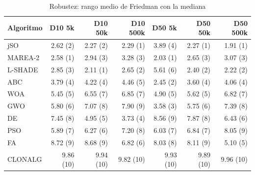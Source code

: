 \begin{table}[ht]\centering\small
\caption{Robustez: rango medio de Friedman con la mediana}
\begin{tabular}{lrrrrrr}
\toprule
Algoritmo & D10 5k & D10 50k & D10 500k & D50 5k & D50 50k & D50 500k \\
\midrule
jSO & 2.62 (2) & 2.27 (2) & 2.29 (1) & 3.89 (4) & 2.27 (1) & 1.91 (1) \\
MAREA-2 & 2.58 (1) & 2.94 (3) & 3.28 (3) & 2.03 (1) & 2.65 (3) & 3.07 (3) \\
L-SHADE & 2.85 (3) & 2.11 (1) & 2.65 (2) & 5.61 (6) & 2.40 (2) & 2.22 (2) \\
ABC & 3.79 (4) & 4.22 (4) & 4.46 (5) & 2.45 (2) & 3.60 (4) & 4.06 (4) \\
WOA & 5.45 (5) & 6.55 (7) & 6.85 (7) & 4.90 (5) & 5.62 (5) & 6.82 (7) \\
GWO & 5.80 (6) & 7.07 (8) & 7.90 (9) & 3.58 (3) & 5.75 (6) & 7.39 (8) \\
DE & 7.45 (8) & 4.95 (5) & 3.73 (4) & 8.56 (9) & 7.87 (8) & 6.43 (6) \\
PSO & 5.89 (7) & 6.27 (6) & 7.20 (8) & 6.03 (7) & 6.84 (7) & 8.05 (9) \\
FA & 8.72 (9) & 8.68 (9) & 6.82 (6) & 8.03 (8) & 8.11 (9) & 5.10 (5) \\
CLONALG & 9.86 (10) & 9.94 (10) & 9.82 (10) & 9.93 (10) & 9.89 (10) & 9.96 (10) \\
\bottomrule
\end{tabular}
\end{table}
